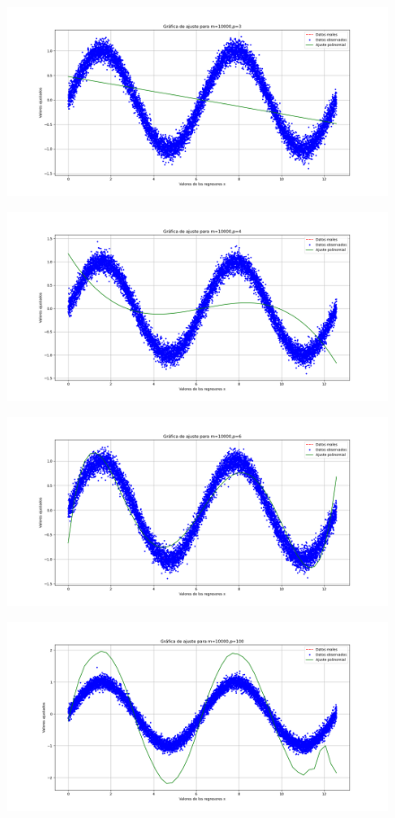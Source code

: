 \documentclass[letterpaper]{article}
\newcommand{\1}{\mathds{1}}
\theoremstyle{definition}
\theoremstyle{definition}
\theoremstyle{definition}
\theoremstyle{definition}
\theoremstyle{definition}
\begin{document}
\begin{enumerate}
\begin{figure}[h]
        \caption{}
    \end{figure}  
    \begin{figure}[h]
        \centering
        \includegraphics[width=0.7\linewidth]{9.png}
        \caption{}
    \end{figure}  
    \begin{figure}[h]
        \centering
        \includegraphics[width=0.7\linewidth]{10.png}
        \caption{}
    \end{figure}  
    \begin{figure}[h]
        \centering
        \includegraphics[width=0.7\linewidth]{11.png}
        \caption{}
    \end{figure}  
    \begin{figure}[h]
        \centering
        \includegraphics[width=0.7\linewidth]{12.png}

\end{figure}
\end{enumerate}
\end{document}
